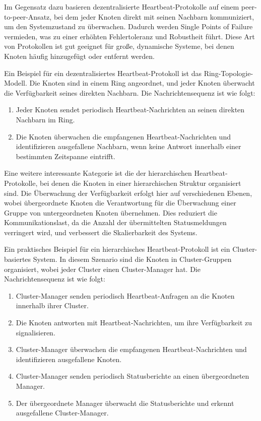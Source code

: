 Im Gegensatz dazu basieren dezentralisierte Heartbeat-Protokolle auf einem peer-to-peer-Ansatz, bei dem jeder Knoten direkt mit seinen Nachbarn kommuniziert, um den Systemzustand zu überwachen. Dadurch werden Single Points of Failure vermieden, was zu einer erhöhten Fehlertoleranz und Robustheit führt. Diese Art von Protokollen ist gut geeignet für große, dynamische Systeme, bei denen Knoten häufig hinzugefügt oder entfernt werden.

Ein Beispiel für ein dezentralisiertes Heartbeat-Protokoll ist das Ring-Topologie-Modell. Die Knoten sind in einem Ring angeordnet, und jeder Knoten überwacht die Verfügbarkeit seines direkten Nachbarn. Die Nachrichtensequenz ist wie folgt:
\begin{enumerate}[label=(\alph*)]
\item Jeder Knoten sendet periodisch Heartbeat-Nachrichten an seinen direkten Nachbarn im Ring.
\item Die Knoten überwachen die empfangenen Heartbeat-Nachrichten und identifizieren ausgefallene Nachbarn, wenn keine Antwort innerhalb einer bestimmten Zeitspanne eintrifft.
\end{enumerate}

Eine weitere interessante Kategorie ist die der hierarchischen Heartbeat-Protokolle, bei denen die Knoten in einer hierarchischen Struktur organisiert sind. Die Überwachung der Verfügbarkeit erfolgt hier auf verschiedenen Ebenen, wobei übergeordnete Knoten die Verantwortung für die Überwachung einer Gruppe von untergeordneten Knoten übernehmen. Dies reduziert die Kommunikationslast, da die Anzahl der übermittelten Statusmeldungen verringert wird, und verbessert die Skalierbarkeit des Systems.

Ein praktisches Beispiel für ein hierarchisches Heartbeat-Protokoll ist ein Cluster-basiertes System. In diesem Szenario sind die Knoten in Cluster-Gruppen organisiert, wobei jeder Cluster einen Cluster-Manager hat. Die Nachrichtensequenz ist wie folgt:
\begin{enumerate}[label=(\alph*)]
\item Cluster-Manager senden periodisch Heartbeat-Anfragen an die Knoten innerhalb ihrer Cluster.
\item Die Knoten antworten mit Heartbeat-Nachrichten, um ihre Verfügbarkeit zu signalisieren.
\item Cluster-Manager überwachen die empfangenen Heartbeat-Nachrichten und identifizieren ausgefallene Knoten.
\item Cluster-Manager senden periodisch Statusberichte an einen übergeordneten Manager.
\item Der übergeordnete Manager überwacht die Statusberichte und erkennt ausgefallene Cluster-Manager.
\end{enumerate}

